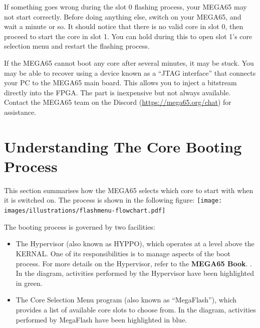 If something goes wrong during the slot 0 flashing process, your MEGA65 may not start correctly. Before doing anything else, switch on your MEGA65, and wait a minute or so. It should notice that there is no valid core in slot 0, then proceed to start the core in slot 1. You can hold  during this to open slot 1's core selection menu and restart the flashing process.

If the MEGA65 cannot boot any core after several minutes, it may be stuck. You may be able to recover using a device known as a ``JTAG interface'' that connects your PC to the MEGA65 main board. This allows you to inject a bitstream directly into the FPGA. The part is inexpensive but not always available. Contact the MEGA65 team on the Discord (\url{https://mega65.org/chat}) for assistance.


\section{Understanding The Core Booting Process}
\nopagebreak
This section summarises how the MEGA65 selects which core to start with when it is switched on. The process is shown in the following figure:
\nopagebreak
\texttt{[image: images/illustrations/flashmenu-flowchart.pdf]}

The booting process is governed by two facilities:
\begin{itemize}
  \item The Hypervisor (also known as HYPPO), which operates at a level above the KERNAL. One of its responsibilities is to manage aspects of the boot process. For more details on the Hypervisor, refer to
\ifdefined\printmanual
the {\bf MEGA65 Book}.
\else
 .
\fi
    In the diagram, activities performed by the Hypervisor have been highlighted in green.
  \item The Core Selection Menu program (also known as ``MegaFlash''), which provides a list of available core slots to choose from. In the diagram, activities performed by MegaFlash have been highlighted in blue.
\end{itemize}

